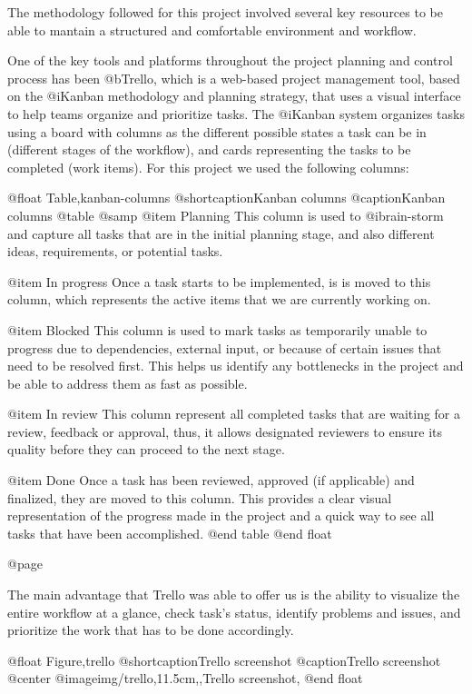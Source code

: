 The methodology followed for this project involved several key resources to be able to mantain a structured and comfortable environment and workflow.

One of the key tools and platforms throughout the project planning and control process has been @b{Trello}, which is a web-based project management tool, based on the @i{Kanban} methodology and planning strategy, that uses a visual interface to help teams organize and prioritize tasks. The @i{Kanban} system organizes tasks using a board with columns as the different possible states a task can be in (different stages of the workflow), and cards representing the tasks to be completed (work items). For this project we used the following columns:

@float Table,kanban-columns
@shortcaption{Kanban columns}
@caption{Kanban columns}
@table @samp
@item Planning
This column is used to @i{brain-storm} and capture all tasks that are in the initial planning stage, and also different ideas, requirements, or potential tasks.

@item In progress
Once a task starts to be implemented, is is moved to this column, which represents the active items that we are currently working on.

@item Blocked
This column is used to mark tasks as temporarily unable to progress due to dependencies, external input, or because of certain issues that need to be resolved first. This helps us identify any bottlenecks in the project and be able to address them as fast as possible.

@item In review
This column represent all completed tasks that are waiting for a review, feedback or approval, thus, it allows designated reviewers to ensure its quality before they can proceed to the next stage.

@item Done
Once a task has been reviewed, approved (if applicable) and finalized, they are moved to this column. This provides a clear visual representation of the progress made in the project and a quick way to see all tasks that have been accomplished.
@end table
@end float

@page

The main advantage that Trello was able to offer us is the ability to visualize the entire workflow at a glance, check task's status, identify problems and issues, and prioritize the work that has to be done accordingly.

@float Figure,trello
@shortcaption{Trello screenshot}
@caption{Trello screenshot}
@center @image{img/trello,11.5cm,,Trello screenshot,}
@end float


